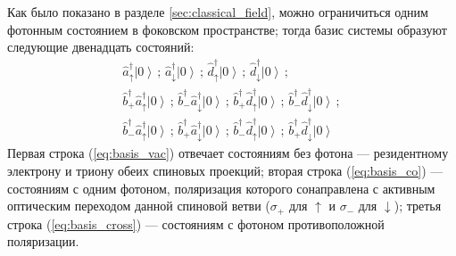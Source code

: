 \documentclass[11pt]{article}    %
\numberwithin{equation}{section}
\begin{document}
Как было показано в разделе \ref{sec:classical_field}, можно ограничиться одним фотонным состоянием
в фоковском пространстве; тогда базис системы образуют следующие
двенадцать состояний:
\begin{gather}
    \hat{a}^{\dag}_{\uparrow} \left| 0 \right\rangle \, ; \, \hat{a}^{\dag}_{\downarrow} \left| 0 \right\rangle \, ; \, \hat{d}^{\dag}_{\uparrow} \left| 0 \right\rangle \, ; \, \hat{d}^{\dag}_{\downarrow} \left| 0 \right\rangle \, ; \label{eq:basis_vac} \\
    \hat{b}^{\dag}_{+} \hat{a}^{\dag}_{\uparrow} \left| 0 \right\rangle \, ; \, \hat{b}^{\dag}_{-} \hat{a}^{\dag}_{\downarrow} \left| 0 \right\rangle \, ; \,
    \hat{b}^{\dag}_{+} \hat{d}^{\dag}_{\uparrow} \left| 0 \right\rangle \, ; \, \hat{b}^{\dag}_{-} \hat{d}^{\dag}_{\downarrow} \left| 0 \right\rangle \, ; \label{eq:basis_co} \\
    \hat{b}^{\dag}_{-} \hat{a}^{\dag}_{\uparrow} \left| 0 \right\rangle \, ; \, \hat{b}^{\dag}_{+} \hat{a}^{\dag}_{\downarrow} \left| 0 \right\rangle \, ; \,
    \hat{b}^{\dag}_{-} \hat{d}^{\dag}_{\uparrow} \left| 0 \right\rangle \, ; \, \hat{b}^{\dag}_{+} \hat{d}^{\dag}_{\downarrow} \left| 0 \right\rangle \label{eq:basis_cross}
\end{gather}
Первая строка (\ref{eq:basis_vac}) отвечает состояниям без фотона ---
резидентному электрону и триону обеих спиновых проекций; вторая строка
(\ref{eq:basis_co}) --- состояниям с одним фотоном, поляризация которого
сонаправлена с активным оптическим переходом данной спиновой ветви
($\sigma_+$ для $\uparrow$ и $\sigma_-$ для $\downarrow$); третья строка
(\ref{eq:basis_cross}) --- состояниям с фотоном противоположной
поляризации.
\end{document}
